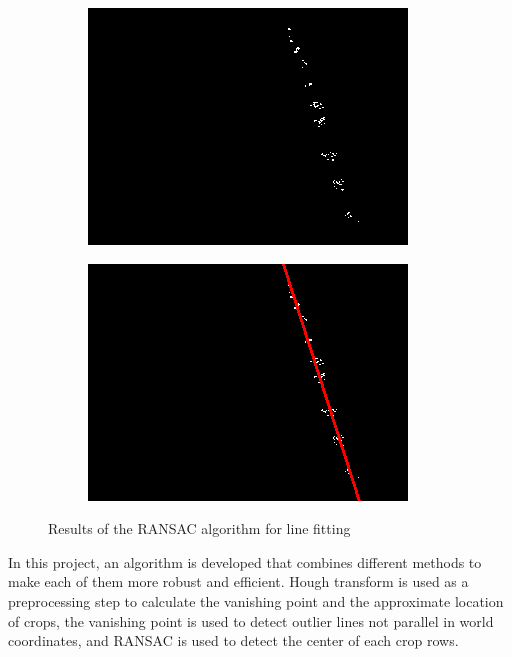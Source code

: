 \begin{figure}[H]
\centering
\begin{subfigure}{0.49\textwidth}
    \includegraphics[width=\textwidth]{Report/images/masked images _ransac.png}
    \label{fig:singlelinemask}
\end{subfigure}
\begin{subfigure}{0.49\textwidth}%
    \includegraphics[width=\textwidth]{Report/images/masked images _ransacfitted.png}
    \label{fig:ransacfitsingline}
\end{subfigure}

\caption{Results of the RANSAC algorithm for line fitting}
\end{figure}
\label{pics: Ransacmasking}

\vspace{20mm}

In this project, an algorithm is developed that combines different methods to make each of them more robust and efficient. Hough transform is used as a preprocessing step to calculate the vanishing point and the approximate location of crops, the vanishing point is used to detect outlier lines not parallel in world coordinates, and RANSAC is used to detect the center of each crop rows. 







